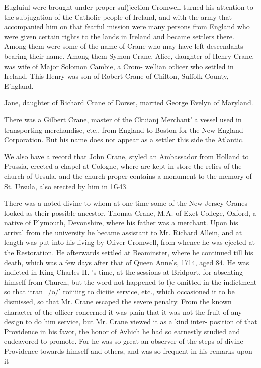\documentclass[oneside]{book}
\begin{document}
Eugluiul were brought under proper sul)jection Cromwell turned 
his attention to the subjugation of the Catholic people of Ireland, 
and with the army that accompanied him on that fearful mission 
were many persons from England who were given certain rights 
to the lands in Ireland and became settlers there. Among them 
were some of the name of Crane who may have left descendants 
bearing their name. Among them Symon Crane, Alice, daughter 
of Henry Crane, was wife of Major Solomon Cambie, a Crom- 
wellian otlicer who settled in Ireland. This Henry was son of 
Robert Crane of Chilton, Suffolk County, E'ngland. 

Jane, daughter of Richard Crane of Dorset, married George 
Evelyn of Maryland. 

There was a Gilbert Crane, master of the Ckuianj Merchant' 
a vessel used in transporting merchandise, etc., from England to 
Boston for the New England Corporation. But his name does 
not appear as a settler this side the Atlantic. 

We also have a record that John Crane, styled an Ambassador 
from Holland to Prussia, erected a chapel at Cologne, where are 
kept in store the relics of the church of Ursula, and the church 
proper contains a monument to the memory of St. Ursula, also 
erected by him in 1G43. 

There was a noted divine to whom at one time some of the 
New Jersey Cranes looked as their possible ancestor. Thomas 
Crane, M.A. of Exet College, Oxford, a native of Plymouth, 
Devonshire, where his father was a merchant. Upon his arrival 
from the university he became assistant to Mr. Richard Allein, 
and at length was put into his living by Oliver Cromwell, from 
whence he was ejected at the Restoration. He afterwards settled 
at Beaminster, where he continued till his death, which was a few 
days after that of Queen Anne's, 1714, aged 84. He was 
indicted in King Charles II. 's time, at the sessions at Bridport, 
for absenting himself from Church, but the word not happened to 
l)e omitted in the indictment so that itran\_/o/' roiiiiitg to diciiie 
service, etc., which occasioned it to be dismissed, so that Mr. 
Crane escaped the severe penalty. From the known character of 
the officer concerned it was plain that it was not the fruit of any 
design to do him service, but Mr. Crane viewed it as a kind inter- 
position of that Providence in his favor, the honor of Avhich he 
had so earnestly studied and eudeavored to promote. For he 
was so great an observer of the steps of divine Providence towards 
himself and others, and was so frequent in his remarks upon it 
\end{document}
